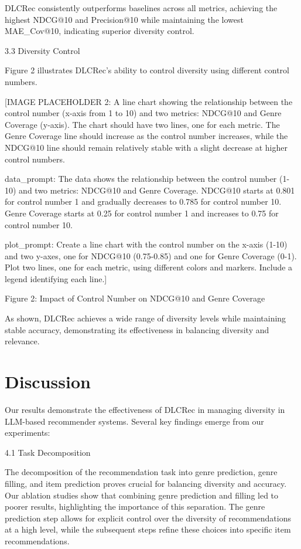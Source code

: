 \documentclass[12pt,letterpaper]{article}
\begin{document}
DLCRec consistently outperforms baselines across all metrics, achieving the highest NDCG@10 and Precision@10 while maintaining the lowest MAE_Cov@10, indicating superior diversity control.

3.3 Diversity Control

Figure 2 illustrates DLCRec's ability to control diversity using different control numbers.

[IMAGE PLACEHOLDER 2: A line chart showing the relationship between the control number (x-axis from 1 to 10) and two metrics: NDCG@10 and Genre Coverage (y-axis). The chart should have two lines, one for each metric. The Genre Coverage line should increase as the control number increases, while the NDCG@10 line should remain relatively stable with a slight decrease at higher control numbers.

data_prompt: The data shows the relationship between the control number (1-10) and two metrics: NDCG@10 and Genre Coverage. NDCG@10 starts at 0.801 for control number 1 and gradually decreases to 0.785 for control number 10. Genre Coverage starts at 0.25 for control number 1 and increases to 0.75 for control number 10.

plot_prompt: Create a line chart with the control number on the x-axis (1-10) and two y-axes, one for NDCG@10 (0.75-0.85) and one for Genre Coverage (0-1). Plot two lines, one for each metric, using different colors and markers. Include a legend identifying each line.]

Figure 2: Impact of Control Number on NDCG@10 and Genre Coverage

As shown, DLCRec achieves a wide range of diversity levels while maintaining stable accuracy, demonstrating its effectiveness in balancing diversity and relevance.

\section{Discussion}

Our results demonstrate the effectiveness of DLCRec in managing diversity in LLM-based recommender systems. Several key findings emerge from our experiments:

4.1 Task Decomposition

The decomposition of the recommendation task into genre prediction, genre filling, and item prediction proves crucial for balancing diversity and accuracy. Our ablation studies show that combining genre prediction and filling led to poorer results, highlighting the importance of this separation. The genre prediction step allows for explicit control over the diversity of recommendations at a high level, while the subsequent steps refine these choices into specific item recommendations.
\end{document}
